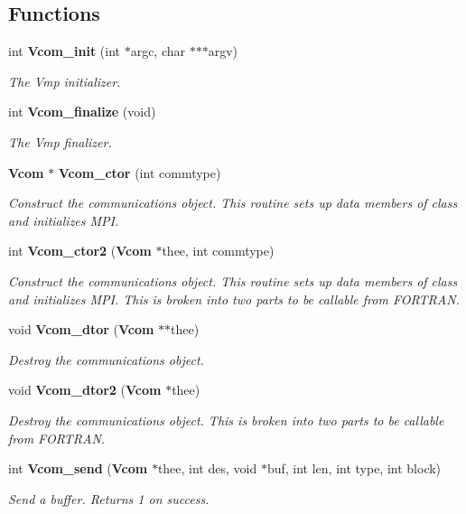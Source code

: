 \subsection*{Functions}
\begin{DoxyCompactItemize}
\item 
int {\bf Vcom\-\_\-init} (int $\ast$argc, char $\ast$$\ast$$\ast$argv)
\begin{DoxyCompactList}\small\item\em The Vmp initializer. \end{DoxyCompactList}\item 
int {\bf Vcom\-\_\-finalize} (void)
\begin{DoxyCompactList}\small\item\em The Vmp finalizer. \end{DoxyCompactList}\item 
{\bf Vcom} $\ast$ {\bf Vcom\-\_\-ctor} (int commtype)
\begin{DoxyCompactList}\small\item\em Construct the communications object. This routine sets up data members of class and initializes M\-P\-I. \end{DoxyCompactList}\item 
int {\bf Vcom\-\_\-ctor2} ({\bf Vcom} $\ast$thee, int commtype)
\begin{DoxyCompactList}\small\item\em Construct the communications object. This routine sets up data members of class and initializes M\-P\-I. This is broken into two parts to be callable from F\-O\-R\-T\-R\-A\-N. \end{DoxyCompactList}\item 
void {\bf Vcom\-\_\-dtor} ({\bf Vcom} $\ast$$\ast$thee)
\begin{DoxyCompactList}\small\item\em Destroy the communications object. \end{DoxyCompactList}\item 
void {\bf Vcom\-\_\-dtor2} ({\bf Vcom} $\ast$thee)
\begin{DoxyCompactList}\small\item\em Destroy the communications object. This is broken into two parts to be callable from F\-O\-R\-T\-R\-A\-N. \end{DoxyCompactList}\item 
int {\bf Vcom\-\_\-send} ({\bf Vcom} $\ast$thee, int des, void $\ast$buf, int len, int type, int block)
\begin{DoxyCompactList}\small\item\em Send a buffer. Returns 1 on success. \end{DoxyCompactList}\item 
$$
\end{DoxyCompactItemize}
